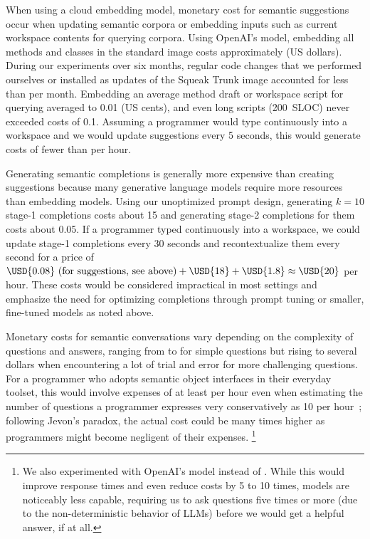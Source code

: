 When using a cloud embedding model, monetary cost for semantic suggestions occur when updating semantic corpora or embedding inputs such as current workspace contents for querying corpora.
Using OpenAI's  model, embedding all methods and classes in the standard image costs approximately  (US dollars).
During our experiments over six months, regular code changes that we performed ourselves or installed as updates of the Squeak Trunk image accounted for less than  per month.
Embedding an average method draft or workspace script for querying averaged to \qty{0.01}{\cent} (US cents), and even long scripts (\qty{200}{SLOC}) never exceeded costs of \qty{0.1}{\cent}.
Assuming a programmer would type continuously into a workspace and we would update suggestions every 5 seconds, this would generate costs of fewer than  per hour.

Generating semantic completions is generally more expensive than creating suggestions because many generative language models require more resources than embedding models.
Using our unoptimized prompt design, generating $k = 10$ stage-1 completions costs about \qty{15}{\cent} and generating stage-2 completions for them costs about \qty{0.05}{\cent}.
If a programmer typed continuously into a workspace, we could update stage-1 completions every 30 seconds and recontextualize them every second for a price of $\USD{0.08}\text{ (for suggestions, see above)} + \USD{18} + \USD{1.8} \approx \USD{20}$ per hour.
These costs would be considered impractical in most settings and emphasize the need for optimizing completions through prompt tuning or smaller, fine-tuned models as noted above.

Monetary costs for semantic conversations vary depending on the complexity of questions and answers, ranging from  to  for simple questions but rising to several dollars when encountering a lot of trial and error for more challenging questions.
For a programmer who adopts semantic object interfaces in their everyday toolset, this would involve expenses of at least  per hour even when estimating the number of questions a programmer expresses very conservatively as 10 per hour~\cite{kubelka2018road}; following Jevon's paradox, the actual cost could be many times higher as programmers might become negligent of their expenses.%
\footnote{%
	We also experimented with OpenAI's  model instead of .
	While this would improve response times and even reduce costs by 5 to 10 times, \gptthreefive models are noticeably less capable, requiring us to ask questions five times or more (due to the non-deterministic behavior of LLMs) before we would get a helpful answer, if at all.
}

